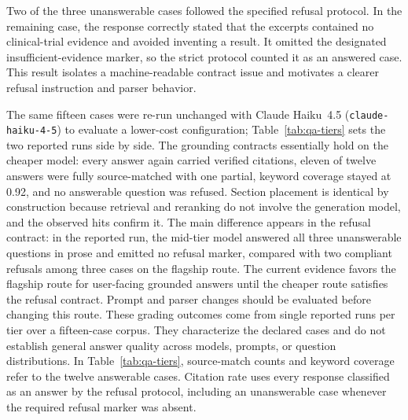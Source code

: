 Two of the three unanswerable cases followed the specified refusal protocol.
In the remaining case, the response correctly stated that the excerpts contained no clinical-trial evidence and avoided inventing a result. It omitted the designated insufficient-evidence marker, so the strict protocol counted it as an answered case.
This result isolates a machine-readable contract issue and motivates a clearer refusal instruction and parser behavior.

The same fifteen cases were re-run unchanged with Claude Haiku~4.5 (\nolinkurl{claude-haiku-4-5}) to evaluate a lower-cost configuration; Table~\ref{tab:qa-tiers} sets the two reported runs side by side.
The grounding contracts essentially hold on the cheaper model: every answer again carried verified citations, eleven of twelve answers were fully source-matched with one partial, keyword coverage stayed at 0.92, and no answerable question was refused.
Section placement is identical by construction because retrieval and reranking do not involve the generation model, and the observed hits confirm it.
The main difference appears in the refusal contract: in the reported run, the mid-tier model answered all three unanswerable questions in prose and emitted no refusal marker, compared with two compliant refusals among three cases on the flagship route.
The current evidence favors the flagship route for user-facing grounded answers until the cheaper route satisfies the refusal contract. Prompt and parser changes should be evaluated before changing this route.
These grading outcomes come from single reported runs per tier over a fifteen-case corpus. They characterize the declared cases and do not establish general answer quality across models, prompts, or question distributions.
In Table~\ref{tab:qa-tiers}, source-match counts and keyword coverage refer to
the twelve answerable cases. Citation rate uses every response classified as
an answer by the refusal protocol, including an unanswerable case whenever the
required refusal marker was absent.

